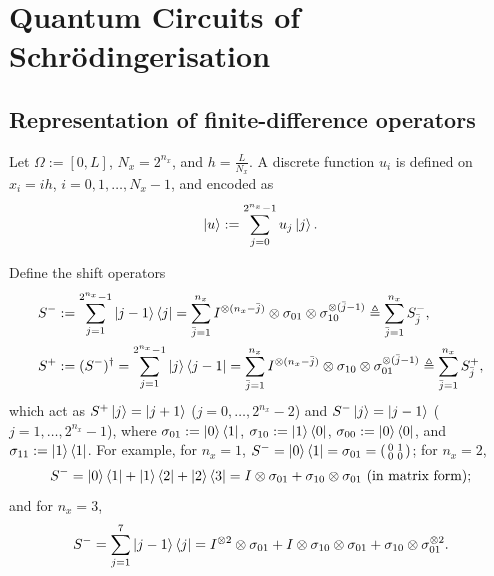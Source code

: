 \chapter{Quantum Circuits of Schr\"odingerisation}\label{ch:sec06}

\section{Representation of finite-difference operators}\label{sec:sec06-fd}

Let $\Omega := [0, L]$, $N_x = 2^{n_x}$, and $h = \tfrac{L}{N_x}$. A discrete
function $u_i$ is defined on $x_i = ih$, $i = 0, 1, \dots, N_x - 1$, and encoded as
\begin{equation}
  \ket{u} := \sum_{j=0}^{2^{n_x}-1} u_j\ket{j}.
\end{equation}

Define the shift operators
\begin{align}
  S^- &:= \sum_{j=1}^{2^{n_x}-1} \ket{j-1}\bra{j} = \sum_{\bar{j}=1}^{n_x} I^{\otimes(n_x - \bar{j})} \otimes \sigma_{01} \otimes \sigma_{10}^{\otimes(\bar{j}-1)} \triangleq \sum_{\bar{j}=1}^{n_x} S^-_{\bar{j}}, \\
  S^+ &:= (S^-)^{\dagger} = \sum_{j=1}^{2^{n_x}-1} \ket{j}\bra{j-1} = \sum_{\bar{j}=1}^{n_x} I^{\otimes(n_x - \bar{j})} \otimes \sigma_{10} \otimes \sigma_{01}^{\otimes(\bar{j}-1)} \triangleq \sum_{\bar{j}=1}^{n_x} S^+_{\bar{j}},
\end{align}
which act as $S^+\ket{j} = \ket{j+1}$ ($j = 0, \dots, 2^{n_x}-2$) and
$S^-\ket{j} = \ket{j-1}$ ($j = 1, \dots, 2^{n_x}-1$), where
$\sigma_{01} := \ket{0}\bra{1}$, $\sigma_{10} := \ket{1}\bra{0}$,
$\sigma_{00} := \ket{0}\bra{0}$, and $\sigma_{11} := \ket{1}\bra{1}$. For example,
for $n_x = 1$, $S^- = \ket{0}\bra{1} = \sigma_{01} = \begin{psmallmatrix} 0 & 1 \\ 0 & 0 \end{psmallmatrix}$;
for $n_x = 2$,
\begin{equation}
  S^- = \ket{0}\bra{1} + \ket{1}\bra{2} + \ket{2}\bra{3}
  = I \otimes \sigma_{01} + \sigma_{10} \otimes \sigma_{01} \ \text{(in matrix form)};
\end{equation}
and for $n_x = 3$,
\begin{equation}
  S^- = \sum_{j=1}^{7}\ket{j-1}\bra{j} = I^{\otimes 2} \otimes \sigma_{01} + I \otimes \sigma_{10} \otimes \sigma_{01} + \sigma_{10} \otimes \sigma_{01}^{\otimes 2}.
\end{equation}

